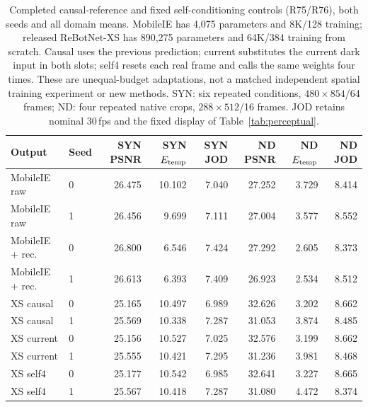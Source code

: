 \begin{table}[!htbp]
\centering\scriptsize\setlength{\tabcolsep}{4pt}
\caption{Completed causal-reference and fixed self-conditioning controls (R75/R76), both seeds and all domain means. MobileIE has 4,075 parameters and 8K/128 training; released ReBotNet-XS has 890,275 parameters and 64K/384 training from scratch. Causal uses the previous prediction; current substitutes the current dark input in both slots; self4 resets each real frame and calls the same weights four times. These are unequal-budget adaptations, not a matched independent spatial training experiment or new methods. SYN: six repeated conditions, $480\times854$/64 frames; ND: four repeated native crops, $288\times512$/16 frames. JOD retains nominal 30\,fps and the fixed display of Table~\ref{tab:perceptual}.}
\label{tab:causal-reference}
\begin{tabular}{llrrrrrr}
\toprule
Output & Seed & SYN PSNR & SYN $E_{\rm temp}$ & SYN JOD & ND PSNR & ND $E_{\rm temp}$ & ND JOD\\
\midrule
MobileIE raw & 0 & 26.475 & 10.102 & 7.040 & 27.252 & 3.729 & 8.414\\
MobileIE raw & 1 & 26.456 & 9.699 & 7.111 & 27.004 & 3.577 & 8.552\\
MobileIE + rec. & 0 & 26.800 & 6.546 & 7.424 & 27.292 & 2.605 & 8.373\\
MobileIE + rec. & 1 & 26.613 & 6.393 & 7.409 & 26.923 & 2.534 & 8.512\\
XS causal & 0 & 25.165 & 10.497 & 6.989 & 32.626 & 3.202 & 8.662\\
XS causal & 1 & 25.569 & 10.338 & 7.287 & 31.053 & 3.874 & 8.485\\
XS current & 0 & 25.156 & 10.527 & 7.025 & 32.576 & 3.199 & 8.662\\
XS current & 1 & 25.555 & 10.421 & 7.295 & 31.236 & 3.981 & 8.468\\
XS self4 & 0 & 25.177 & 10.542 & 6.985 & 32.641 & 3.227 & 8.665\\
XS self4 & 1 & 25.567 & 10.418 & 7.287 & 31.080 & 4.472 & 8.374\\
\bottomrule
\end{tabular}
\end{table}
